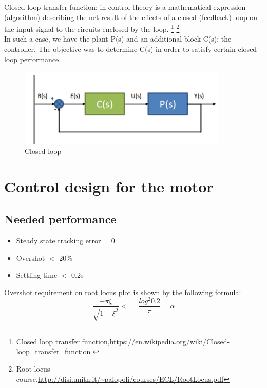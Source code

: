 \documentclass[a4paper,12pt,oneside]{article}
\begin{document}
\begin{enumerate}
Closed-loop transfer function: in control theory is a mathematical expression (algorithm) describing the net result of the effects of a closed (feedback) loop on the input signal to the circuits enclosed by the loop. \footnote{Closed loop transfer function,\url{https://en.wikipedia.org/wiki/Closed-loop_transfer_function }}
\footnote{Root locus course,\url{http://disi.unitn.it/~palopoli/courses/ECL/RootLocus.pdf}}\\

In such a case, we have the plant P(s) and an additional block C(s): the controller. The objective was to determine C(s) in order to satisfy certain closed loop performance.

\begin{figure}[h]%
	\centering
	\includegraphics[keepaspectratio=true, width=10cm]{closedloop.png}
	\caption{Closed loop}%
	\label{fig:closedloop}%
\end{figure}

\section{Control design for the motor}
\subsection{Needed performance}
\begin{itemize}
\item Steady state tracking error = 0
\item Overshot $<$ 20\%
\item Settling time $<$ 0.2s
\end{itemize}
Overshot requirement on root locus plot is shown by the following formula:
\begin{equation}
\frac{-{\pi}{\xi}}{\sqrt{1-\xi^{2}}} <= \frac{log^2{0.2}}{\pi} = \alpha
\end{equation}



\end{enumerate}
\end{document}
